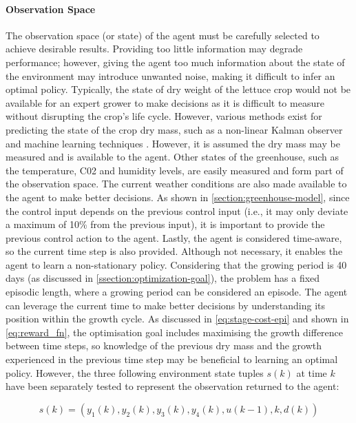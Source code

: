 \paragraph{Observation Space}
The observation space (or state) of the agent must be carefully selected to achieve desirable results. Providing too little information may degrade performance; however, giving the agent too much information about the state of the environment may introduce unwanted noise, making it difficult to infer an optimal policy. Typically, the state of dry weight of the lettuce crop would not be available for an expert grower to make decisions as it is difficult to measure without disrupting the crop’s life cycle. However, various methods exist for predicting the state of the crop dry mass, such as a non-linear Kalman observer and machine learning techniques \cite{gongDeepLearningBased2021}. However, it is assumed the dry mass may be measured and is available to the agent. Other states of the greenhouse, such as the temperature, C02 and humidity levels, are easily measured and form part of the observation space. The current weather conditions are also made available to the agent to make better decisions. As shown in \autoref{section:greenhouse-model}, since the control input depends on the previous control input (i.e., it may only deviate a maximum of 10\% from the previous input), it is important to provide the previous control action to the agent. Lastly, the agent is considered time-aware, so the current time step is also provided. Although not necessary, it enables the agent to learn a non-stationary policy. Considering that the growing period is 40 days (as discussed in \autoref{ssection:optimization-goal}), the problem has a fixed episodic length, where a growing period can be considered an episode. The agent can leverage the current time to make better decisions by understanding its position within the growth cycle. As discussed in \autoref{eq:stage-cost-epi} and shown in \autoref{eq:reward_fn}, the optimisation goal includes maximising the growth difference between time steps, so knowledge of the previous dry mass and the growth experienced in the previous time step may be beneficial to learning an optimal policy. However, the three following environment state tuples $s(k)$ at time $k$ have been separately tested to represent the observation returned to the agent:

\begin{equation}\label{eq:obs-tuple-1}
    s(k) = (y_1(k),y_2(k),y_3(k),y_4(k), u(k-1), k, d(k))
\end{equation}

